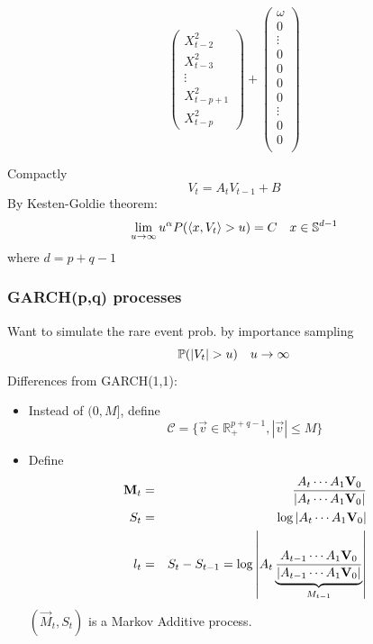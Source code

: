 \documentclass{beamer}
\begin{document}
\begin{frame}
\begin{tiny}
\begin{equation*}
\begin{pmatrix}
        X_{t-2}^2 \\
        X_{t-3}^2 \\
        \vdots \\
        X_{t-p+1}^2 \\
        X_{t-p}^2
      \end{pmatrix} +
      \begin{pmatrix}
        \omega \\
        0 \\
        \vdots \\
        0 \\
        0 \\
        0 \\
        0 \\
        \vdots \\
        0 \\
        0 \\
      \end{pmatrix}
    \end{equation*}
  \end{tiny}
    Compactly
    \[
    V_t = A_t V_{t-1} + B
    \]
    By Kesten-Goldie theorem:
    \[
    \lim_{u \to \infty} u^{\alpha} P(\inn{x, V_t} > u) = C \quad x \in \mathbb S^{d-1}
    \]
    where $d = p + q -1$
\end{frame}

\begin{frame}
  \frametitle{GARCH(p,q) processes}
  \begin{scriptsize}
    Want to simulate the rare event prob. by importance sampling
    \[
    \P(|V_t| > u) \quad u \to \infty  
    \]
    Differences from GARCH(1,1):
    \begin{itemize}
    \item Instead of $(0, M]$, define
      \[
      \mathcal C = \{\vec v \in \mathbb R_+^{p+q-1}, |\vec v| \leq M\}
      \]
    \item Define
      \begin{eqnarray*}
        \vec M_t &=& A_{t} \cdots A_1 \vec V_0 \over |A_{t} \cdots A_1 \vec V_0| \\
        S_t &=& \log |A_t \cdots A_1 \vec V_0| \\
        l_t &=& S_t - S_{t-1} =
                  \log \left|A_t
                  \underbrace{
                  {A_{t-1} \cdots A_1 \vec V_0 \over |A_{t-1} \cdots A_1 \vec V_0|}
                  }_{M_{t-1}}
                  \right|
      \end{eqnarray*}
      $(\vec M_t, S_t)$ is a Markov Additive process.
    \end{itemize}
  \end{scriptsize}
\end{frame}
\end{document}
